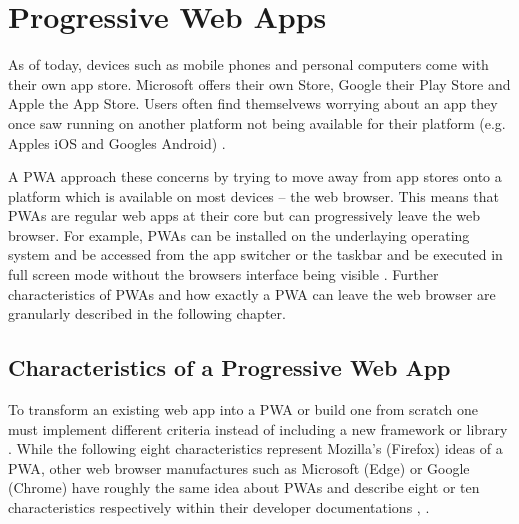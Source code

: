 \section{Progressive Web Apps}
\label{sec:theorieC}


As of today, devices such as mobile phones and personal computers come with their own app store. Microsoft offers their own Store, Google their Play Store and Apple the App Store. Users often find themselvews worrying about an app they once saw running on another platform not being available for their platform (e.g. Apples iOS and Googles Android) \cite[p. 3]{sheppardBeginningProgressiveWeb2017}.

A \ac{PWA} approach these concerns by trying to move away from app stores onto a platform which is available on most devices – the web browser. This means that \acs{PWA}s are regular web apps at their core but can progressively leave the web browser. For example, \acs{PWA}s can be installed on the underlaying operating system and be accessed from the app switcher or the taskbar and be executed in full screen mode without the browsers interface being visible \cite[p. 26]{liebelProgressiveWebApps2019}. Further characteristics of  \acs{PWA}s and how exactly a  \acs{PWA} can leave the web browser are granularly described in the following chapter.


\subsection{Characteristics of a Progressive Web App}
\label{sec:theorieCa}


To transform an existing web app into a  \acs{PWA} or build one from scratch one must implement different criteria instead of including a new framework or library \cite[p. 6]{sheppardBeginningProgressiveWeb2017}.
While the following eight characteristics represent Mozilla’s (Firefox) ideas of a  \acs{PWA}, other web browser manufactures such as Microsoft (Edge) or Google (Chrome) have roughly the same idea about  \acs{PWA}s and describe eight or ten characteristics respectively within their developer documentations \cite[p. 90]{liebelProgressiveWebApps2019}, \cite{ProgressiveWebApps}.

